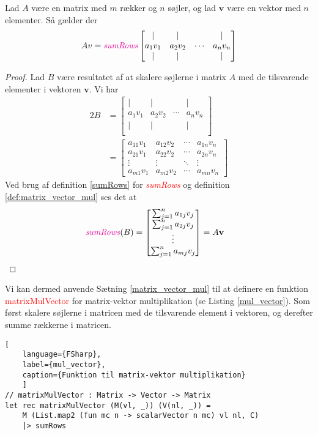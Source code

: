 \begin{theorem} \label{matrix_vector_mul}
    Lad $A$ være en matrix med $m$ rækker og $n$ søjler, og lad $\mathbf{v}$ være en vektor med $n$ elementer. Så gælder der
    \[ Av = \textit{\textcolor{red}{sumRows}}
    \begin{bmatrix}
        | & | &        & | \\
        a_{1}v_{1} & a_{2}v_{2} & \cdots & a_{n}v_{n} \\
        | & | &        & | \\
    \end{bmatrix}
    \]
\end{theorem}
\begin{proof}
    Lad $B$ være resultatet af at skalere søjlerne i matrix $A$ med de tilsvarende elementer i vektoren $\mathbf{v}$. Vi har
    \begin{alignat*}{2}
    B &= \begin{bmatrix}
        | & | &        & | \\
        a_{1}v_{1} & a_{2}v_{2} & \cdots & a_{n}v_{n} \\
        | & | &        & | \\
    \end{bmatrix} \\
    &= \begin{bmatrix}
        a_{11}v_{1} & a_{12}v_{2} & \cdots & a_{1n}v_{n} \\
        a_{21}v_{1} & a_{22}v_{2} & \cdots & a_{2n}v_{n} \\
        \vdots & \vdots & \ddots & \vdots \\
        a_{m1}v_{1} & a_{m2}v_{2} & \cdots & a_{mn}v_{n}
    \end{bmatrix}
    \end{alignat*}
    Ved brug af definition \ref{sumRows} for \textit{\textcolor{red}{sumRows}} og definition \ref{def:matrix_vector_mul} ses det at 
    \begin{alignat*}{2}
    \text{{\color{red}\textit{sumRows}}}(B) &= \begin{bmatrix}
        \sum_{j=1}^{n} a_{1j}v_{j} \\
        \sum_{j=1}^{n} a_{2j}v_{j} \\
        \vdots \\
        \sum_{j=1}^{n} a_{mj}v_{j}
    \end{bmatrix} = A\mathbf{v}
    \end{alignat*}
    \end{proof}
Vi kan dermed anvende Sætning \ref{matrix_vector_mul} til at definere en funktion \textcolor{red}{matrixMulVector} for matrix-vektor multiplikation (se Listing \ref{mul_vector}). Som først skalere søjlerne i matricen med de tilsvarende element i vektoren, og derefter summe rækkerne i matricen. 
\begin{lstlisting}[
    language={FSharp}, 
    label={mul_vector}, 
    caption={Funktion til matrix-vektor multiplikation}
    ]
// matrixMulVector : Matrix -> Vector -> Matrix
let rec matrixMulVector (M(vl, _)) (V(nl, _)) =
    M (List.map2 (fun mc n -> scalarVector n mc) vl nl, C) 
    |> sumRows
\end{lstlisting}

